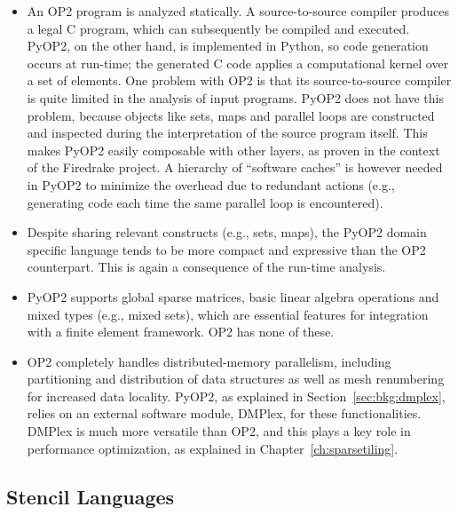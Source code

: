 \begin{itemize}
\item An OP2 program is analyzed statically. A source-to-source compiler produces a legal C program, which can subsequently be compiled and executed. PyOP2, on the other hand, is implemented in Python, so code generation occurs at run-time; the generated C code applies a computational kernel over a set of elements. One problem with OP2 is that its source-to-source compiler is quite limited in the analysis of input programs. PyOP2 does not have this problem, because objects like sets, maps and parallel loops are constructed and inspected during the interpretation of the source program itself. This makes PyOP2 easily composable with other layers, as proven in the context of the Firedrake project. A hierarchy of ``software caches'' is however needed in PyOP2 to minimize the overhead due to redundant actions (e.g., generating code each time the same parallel loop is encountered).

\item Despite sharing relevant constructs (e.g., sets, maps), the PyOP2 domain specific language tends to be more compact and expressive than the OP2 counterpart. This is again a consequence of the run-time analysis.

\item PyOP2 supports global sparse matrices, basic linear algebra operations and mixed types (e.g., mixed sets), which are essential features for integration with a finite element framework. OP2 has none of these. 

\item OP2 completely handles distributed-memory parallelism, including partitioning and distribution of data structures as well as mesh renumbering for increased data locality. PyOP2, as explained in Section~\ref{sec:bkg:dmplex}, relies on an external software module, DMPlex, for these functionalities. DMPlex is much more versatile than OP2, and this plays a key role in performance optimization, as explained in Chapter~\ref{ch:sparsetiling}.
\end{itemize}



\subsection{Stencil Languages}
\label{sec:bkg:stencil-lang}


